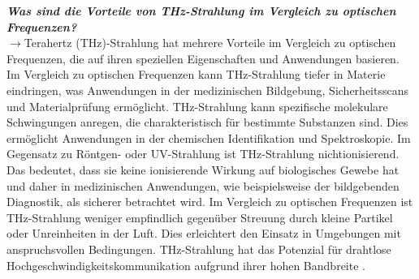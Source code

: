 \textbf{\textit{Was sind die Vorteile von THz-Strahlung im Vergleich zu optischen Frequenzen?}}\\
$\rightarrow$Terahertz (THz)-Strahlung hat mehrere Vorteile im Vergleich zu optischen Frequenzen, 
die auf ihren speziellen Eigenschaften und Anwendungen basieren. 
Im Vergleich zu optischen Frequenzen kann THz-Strahlung tiefer in Materie eindringen, 
was Anwendungen in der medizinischen Bildgebung, Sicherheitsscans und Materialprüfung ermöglicht.
THz-Strahlung kann spezifische molekulare Schwingungen anregen, die charakteristisch 
für bestimmte Substanzen sind. 
Dies ermöglicht Anwendungen in der chemischen Identifikation und Spektroskopie.
Im Gegensatz zu Röntgen- oder UV-Strahlung ist THz-Strahlung nichtionisierend. 
Das bedeutet, dass sie keine ionisierende Wirkung auf biologisches Gewebe hat 
und daher in medizinischen Anwendungen, wie beispielsweise der bildgebenden Diagnostik, 
als sicherer betrachtet wird.
Im Vergleich zu optischen Frequenzen ist THz-Strahlung weniger empfindlich gegenüber 
Streuung durch kleine Partikel oder Unreinheiten in der Luft. 
Dies erleichtert den Einsatz in Umgebungen mit anspruchsvollen Bedingungen.
THz-Strahlung hat das Potenzial für drahtlose Hochgeschwindigkeitskommunikation 
aufgrund ihrer hohen Bandbreite \cite{Kohler,Gap,UltraFast}.